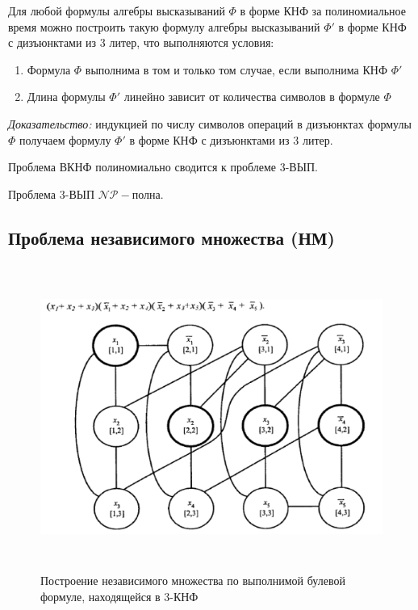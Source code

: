 \begin{theorem}
    Для любой формулы алгебры высказываний $\Phi$ в форме КНФ за полиномиальное время можно построить такую формулу алгебры высказываний $\Phi'$ в форме КНФ с дизъюнктами из 3 литер, что выполняются условия:
    \begin{enumerate}
        \item Формула $\Phi$ выполнима в том и только том случае, если выполнима КНФ $\Phi'$
        \item Длина формулы $\Phi'$ линейно зависит от количества символов в формуле $\Phi$
    \end{enumerate}
\end{theorem}
\textit{Доказательство:} индукцией по числу символов операций в дизъюнктах формулы $\Phi$ получаем формулу $\Phi'$ в форме КНФ с дизъюнктами из 3 литер.

\begin{theorem}
    Проблема ВКНФ полиномиально сводится к проблеме 3-ВЫП.
\end{theorem}

\begin{corollary}
    Проблема 3-ВЫП $\mathscr{NP-}$полна.
\end{corollary}

\subsection*{Проблема независимого множества (НМ)}
\begin{figure}[H]
    \centering
    \includegraphics[height = 10cm]{images/independent.png}
    \caption{Построение независимого множества по выполнимой булевой формуле, находящейся в 3-КНФ}
\end{figure}

